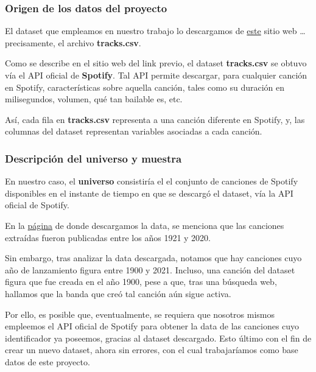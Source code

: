 \documentclass[
  letterpaper,
  DIV=11,
  numbers=noendperiod]{scrartcl}
\begin{document}
\hypertarget{origen-de-los-datos-del-proyecto}{%
\subsubsection{Origen de los datos del
proyecto}\label{origen-de-los-datos-del-proyecto}}

El dataset que empleamos en nuestro trabajo lo descargamos de
\href{https://www.kaggle.com/datasets/yamaerenay/spotify-dataset-19212020-600k-tracks?resource=download}{este}
sitio web \ldots{} precisamente, el archivo \textbf{tracks.csv}.

Como se describe en el sitio web del link previo, el dataset
\textbf{tracks.csv} se obtuvo vía el API oficial de \textbf{Spotify}.
Tal API permite descargar, para cualquier canción en Spotify,
características sobre aquella canción, tales como su duración en
milisegundos, volumen, qué tan bailable es, etc.

Así, cada fila en \textbf{tracks.csv} representa a una canción diferente
en Spotify, y, las columnas del dataset representan variables asociadas
a cada canción.

\hypertarget{descripciuxf3n-del-universo-y-muestra}{%
\subsubsection{Descripción del universo y
muestra}\label{descripciuxf3n-del-universo-y-muestra}}

En nuestro caso, el \textbf{universo} consistiría el el conjunto de
canciones de Spotify disponibles en el instante de tiempo en que se
descargó el dataset, vía la API oficial de Spotify.

En la
\href{https://www.kaggle.com/datasets/yamaerenay/spotify-dataset-19212020-600k-tracks?resource=download}{página}
de donde descargamos la data, se menciona que las canciones extraídas
fueron publicadas entre los años 1921 y 2020.

Sin embargo, tras analizar la data descargada, notamos que hay canciones
cuyo año de lanzamiento figura entre 1900 y 2021. Incluso, una canción
del dataset figura que fue creada en el año 1900, pese a que, tras una
búsqueda web, hallamos que la banda que creó tal canción aún sigue
activa.

Por ello, es posible que, eventualmente, se requiera que nosotros mismos
empleemos el API oficial de Spotify para obtener la data de las
canciones cuyo identificador ya poseemos, gracias al dataset descargado.
Esto último con el fin de crear un nuevo dataset, ahora sin errores, con
el cual trabajaríamos como base datos de este proyecto.
\end{document}
